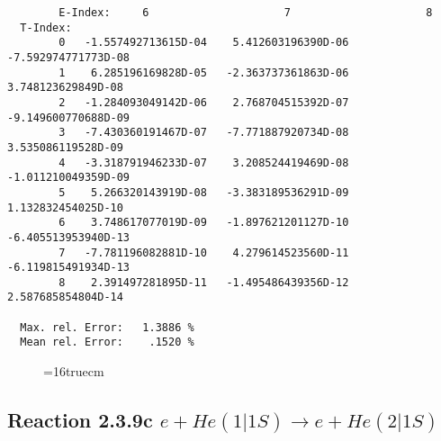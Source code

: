 \documentclass[12pt]{article}
\begin{document}
\begin{small}
\begin{verbatim}
        E-Index:     6                     7                     8
  T-Index:
        0   -1.557492713615D-04    5.412603196390D-06   -7.592974771773D-08
        1    6.285196169828D-05   -2.363737361863D-06    3.748123629849D-08
        2   -1.284093049142D-06    2.768704515392D-07   -9.149600770688D-09
        3   -7.430360191467D-07   -7.771887920734D-08    3.535086119528D-09
        4   -3.318791946233D-07    3.208524419469D-08   -1.011210049359D-09
        5    5.266320143919D-08   -3.383189536291D-09    1.132832454025D-10
        6    3.748617077019D-09   -1.897621201127D-10   -6.405513953940D-13
        7   -7.781196082881D-10    4.279614523560D-11   -6.119815491934D-13
        8    2.391497281895D-11   -1.495486439356D-12    2.587685854804D-14

  Max. rel. Error:   1.3886 %
  Mean rel. Error:    .1520 %

\end{verbatim}\end{small}
\begin{figure} \label{2.3.9b}
\epsfxsize=16truecm
\end{figure}
\newpage


\subsection{
Reaction 2.3.9c  $e + He(1|1S) \rightarrow e + He(2|1S) $
}
\end{document}
